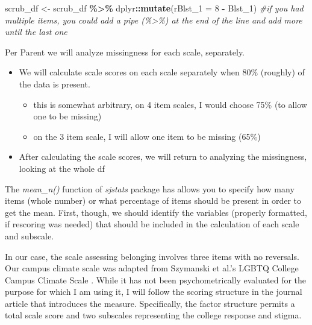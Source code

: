 \documentclass[
  11pt,
]{book}
\newenvironment{Shaded}{\begin{snugshade}}{\end{snugshade}}
\newcommand{\AttributeTok}[1]{\textcolor[rgb]{0.27,0.27,0.27}{#1}}
\newcommand{\CommentTok}[1]{\textcolor[rgb]{0.37,0.37,0.37}{\textit{#1}}}
\newcommand{\DecValTok}[1]{\textcolor[rgb]{0.06,0.06,0.06}{#1}}
\newcommand{\FunctionTok}[1]{\textcolor[rgb]{0.27,0.27,0.27}{\textbf{#1}}}
\newcommand{\NormalTok}[1]{#1}
\newcommand{\OtherTok}[1]{\textcolor[rgb]{0.37,0.37,0.37}{#1}}
\newcommand{\SpecialCharTok}[1]{\textcolor[rgb]{0.43,0.43,0.43}{\textbf{#1}}}
\providecommand{\tightlist}{%
  \setlength{\itemsep}{0pt}\setlength{\parskip}{0pt}}
\begin{document}
\begin{Shaded}
\begin{Highlighting}[]
\NormalTok{scrub\_df }\OtherTok{\textless{}{-}}\NormalTok{ scrub\_df }\SpecialCharTok{\%\textgreater{}\%}
\NormalTok{    dplyr}\SpecialCharTok{::}\FunctionTok{mutate}\NormalTok{(}\AttributeTok{rBlst\_1 =} \DecValTok{8} \SpecialCharTok{{-}}\NormalTok{ Blst\_1)  }\CommentTok{\#if you had multiple items, you could add a pipe (\%\textgreater{}\%) at the end of the line and add more until the last one}
\end{Highlighting}
\end{Shaded}

Per Parent \citeyearpar{parent_handling_2013} we will analyze missingness for each scale, separately.

\begin{itemize}
\tightlist
\item
  We will calculate scale scores on each scale separately when 80\% (roughly) of the data is present.

  \begin{itemize}
  \tightlist
  \item
    this is somewhat arbitrary, on 4 item scales, I would choose 75\% (to allow one to be missing)
  \item
    on the 3 item scale, I will allow one item to be missing (65\%)
  \end{itemize}
\item
  After calculating the scale scores, we will return to analyzing the missingness, looking at the whole df
\end{itemize}

The \emph{mean\_n()} function of \emph{sjstats} package has allows you to specify how many items (whole number) or what percentage of items should be present in order to get the mean. First, though, we should identify the variables (properly formatted, if rescoring was needed) that should be included in the calculation of each scale and subscale.

In our case, the scale assessing belonging \citep{bollen_perceived_1990, hurtado_effects_1997} involves three items with no reversals. Our campus climate scale was adapted from Szymanski et al.'s LGBTQ College Campus Climate Scale \citep{szymanski_perceptions_2020}. While it has not been psychometrically evaluated for the purpose for which I am using it, I will follow the scoring structure in the journal article that introduces the measure. Specifically, the factor structure permits a total scale score and two subscales representing the college response and stigma.
\end{document}
